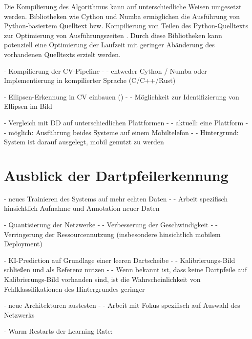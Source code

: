 Die Kompilierung des Algorithmus kann auf unterschiedliche Weisen umgesetzt werden. Bibliotheken wie Cython und Numba ermöglichen die Ausführung von Python-basiertem Quelltext bzw. Kompilierung von Teilen des Python-Quelltexts zur Optimierung von Ausführungszeiten \cite{cython,numba}. Durch diese Bibliotheken kann potenziell eine Optimierung der Laufzeit mit geringer Abänderung des vorhandenen Quelltexts erzielt werden.

- Kompilierung der CV-Pipeline
- - entweder Cython \cite{cython} / Numba \cite{numba} oder Implementierung in kompilierter Sprache (C/C++/Rust)

- Ellipsen-Erkennung in CV einbauen (\cite{ellipse_detection_algorithm})
- - Möglichkeit zur Identifizierung von Ellipsen im Bild

- Vergleich mit DD auf unterschiedlichen Plattformen
- - aktuell: eine Plattform
- - möglich: Ausführung beides Systeme auf einem Mobiltelefon
- - Hintergrund: System ist darauf ausgelegt, mobil genutzt zu werden



\section{Ausblick der Dartpfeilerkennung}
\label{sec:ausblick_ki}

- neues Trainieren des Systems auf mehr echten Daten
- - Arbeit spezifisch hinsichtlich Aufnahme und Annotation neuer Daten

- Quantisierung der Netzwerke
- - Verbesserung der Geschwindigkeit
- - Verringerung der Ressourcennutzung (insbesondere hinsichtlich mobilem Deployment)

- KI-Prediction auf Grundlage einer leeren Dartscheibe
- - Kalibrierungs-Bild schließen und als Referenz nutzen
- - Wenn bekannt ist, dass keine Dartpfeile auf Kalibrierungs-Bild vorhanden sind, ist die Wahrscheinlichkeit von Fehlklassifikationen des Hintergrundes geringer

- neue Architekturen austesten
- - Arbeit mit Fokus spezifisch auf Auswahl des Netzwerks

- Warm Restarts der Learning Rate: \cite{lr_warm_restart}

